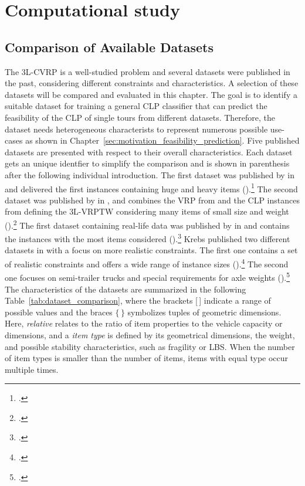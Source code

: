 \chapter{Computational study}
\label{chap:computational_study}

\section{Comparison of Available Datasets}
\label{sec:dataset_selection}

The \gls{3L-CVRP} is a well-studied problem and several datasets were published in the past, considering
different constraints and characteristics. A selection of these datasets will be compared and evaluated
in this chapter. The goal is to identify a suitable dataset for training a general \gls{CLP} classifier that can predict
the feasibility of the \gls{CLP} of single tours from different datasets. Therefore, the dataset needs
heterogeneous characterists to represent numerous possible use-cases
as shown in Chapter~\ref{sec:motivation_feasibility_prediction}. Five published  datasets are presented with respect to their overall characteristics.
Each dataset gets an unique identfier to simplify the comparison and is shown in parenthesis
after the following individual introduction. The first  dataset was published by \citeauthor{gendreau_tabu_2006} in
\citeyear{gendreau_tabu_2006} and delivered the first  instances containing huge and heavy items (\gendreauDataSet).\footcite[cf.][]{gendreau_tabu_2006}
The second dataset was published by \citeauthor{moura_integrated_2009} in \citeyear{moura_integrated_2009},
and combines the \gls{VRP} from \citeauthor{solomon_algorithms_1987} and the \gls{CLP} instances from
\citeauthor{bischoff_issues_1995} defining the \gls{3L-VRPTW} considering
many items of small size and weight (\mouraDataSet).\footcites[cf.][]{solomon_algorithms_1987,bischoff_issues_1995}[][]{moura_integrated_2009}
The first dataset containing real-life data was published by \citeauthor{ceschia_local_2013} in \citeyear{ceschia_local_2013}
and contains the instances with the most items considered (\ceschiaDataSet).\footcite[cf.][]{ceschia_local_2013}
Krebs published two different datasets in
\citeyear{krebs_advanced_2021} with a focus on more realistic constraints. The first one contains a set
of realistic constraints and offers a wide range of instance sizes (\krebsADataSet).\footcite[cf.][]{krebs_advanced_2021}
The second one focuses on semi-trailer trucks and special requirements for axle weights (\krebsBDataSet).\footcite[cf.][]{krebs_axle_2021}
The characteristics of the datasets are summarized in the following Table~\ref{tab:dataset_comparison},
where the brackets [\,] indicate a range of possible values and the braces $\{\,\}$ symbolizes tuples of geometric dimensions.
Here, \textit{relative} relates to the ratio of item properties to the vehicle capacity or dimensions,
and a \textit{item type} is defined by its geometrical dimensions, the weight, and possible stability characteristics, such as fragility or \gls{LBS}.
When the number of item types is smaller than the number of items, items with equal type occur multiple times.


